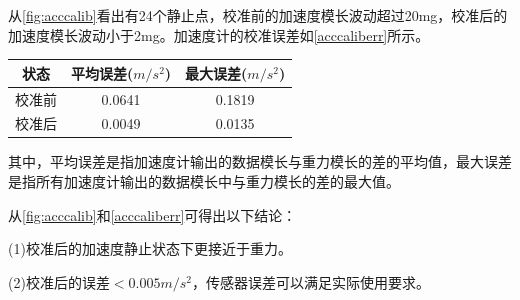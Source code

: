\documentclass[
  type=master
]{gdutthesis}
\begin{document}
从\autoref{fig:acccalib}看出有24个静止点，校准前的加速度模长波动超过20mg，校准后的加速度模长波动小于2mg。加速度计的校准误差如\autoref{acccaliberr}所示。
\begin{table}[H]
	\label{acccaliberr}
	\begin{tabular}{ccc}
		\toprule
		状态 & 平均误差($m/s^2$) & 最大误差($m/s^2$) \\
		\midrule
		校准前 & 0.0641 & 0.1819 \\
		校准后 & 0.0049 & 0.0135 \\
		\bottomrule
	\end{tabular}
\end{table}
其中，平均误差是指加速度计输出的数据模长与重力模长的差的平均值，最大误差是指所有加速度计输出的数据模长中与重力模长的差的最大值。

从\autoref{fig:acccalib}和\autoref{acccaliberr}可得出以下结论：

(1)校准后的加速度静止状态下更接近于重力。

(2)校准后的误差$<0.005m/s^2$，传感器误差可以满足实际使用要求。
\end{document}
